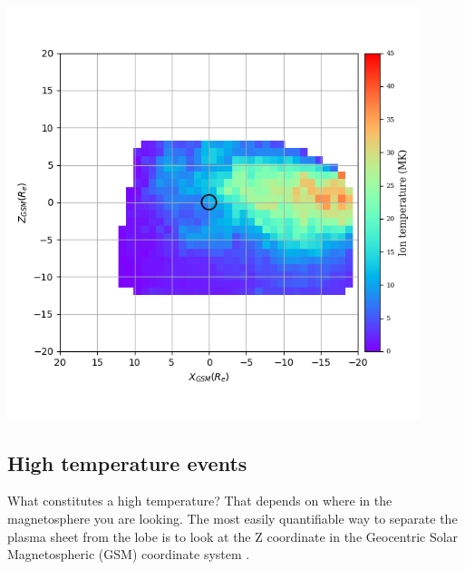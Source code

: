 \documentclass[12pt]{article}
\newenvironment{Figure}
  {\par\medskip\noindent\minipage{\linewidth}}
  {\endminipage\par\medskip}
\begin{document}
\begin{Figure}
    \begin{minipage}[c]{0.57\textwidth}
        \centering
        \includegraphics[width=0.9\textwidth]{tempLocations.png}
    \end{minipage}\hfill
    \begin{minipage}[c]{0.4\textwidth}
        \label{fig:tempLocations}
    \end{minipage}
\end{Figure}

\subsection{High temperature events}
What constitutes a high temperature? That depends on where in the magnetosphere you are looking. The most easily quantifiable way to separate the plasma sheet from the lobe is to look at the Z coordinate in the Geocentric Solar Magnetospheric (GSM) coordinate system \cite{maus_2006}.
\end{document}
